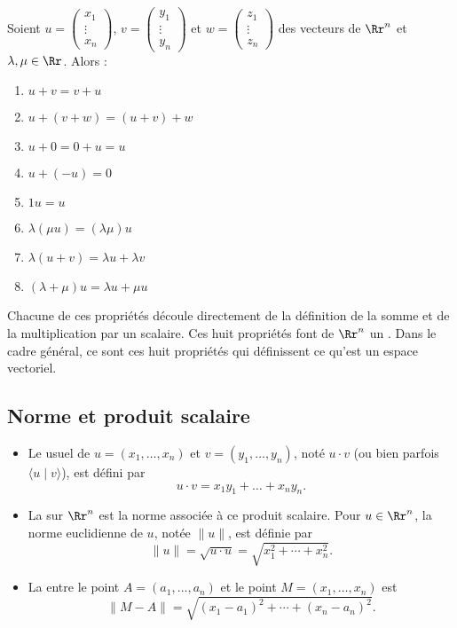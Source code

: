 \documentclass[11pt,class=report,crop=false]{standalone}
\begin{document}
\begin{theoreme}
Soient $u = \left(\begin{smallmatrix} x_1\\ \vdots \\ x_n \end{smallmatrix}\right)$, $v = \left(\begin{smallmatrix} y_1\\ \vdots \\ y_n \end{smallmatrix}\right)$
et $w = \left(\begin{smallmatrix} z_1\\ \vdots \\ z_n \end{smallmatrix}\right)$ des vecteurs de $\Rr^n$
et $\lambda, \mu \in \Rr$. Alors :
\begin{enumerate}
\item $u + v = v + u$
\item $u + (v+w) = (u+v) +w$
\item $u + 0 = 0 + u = u$
\item $u + (-u) = 0$
\item $1 u = u$
\item $\lambda (\mu u) = (\lambda\mu )u$
\item $\lambda (u+v) = \lambda u + \lambda v$
\item $(\lambda + \mu ) u = \lambda u + \mu u$
\end{enumerate}
\end{theoreme}



Chacune de ces propriétés découle directement de la définition de la somme
et de la multiplication par un scalaire. Ces huit propriétés font de $\Rr^n$ un
. Dans le cadre général, ce sont ces huit propriétés qui définissent
ce qu'est un espace vectoriel.

\subsection{Norme et produit scalaire}

\begin{itemize}
    \item Le  usuel de $u=(x_1,\ldots ,x_n)$ et $v=(y_1,\ldots ,y_n)$, noté $u \cdot v$ (ou bien parfois $\langle u \mid v\rangle$), est défini par
  $$u \cdot v= x_1y_1+\dots +x_ny_n.$$
  
    \item La  sur $\Rr^n$ est la norme associée à ce produit scalaire. Pour $u\in \Rr^n$, la norme euclidienne de $u$, notée $\| u\|$, est définie par
  $$\| u \| = \sqrt{u \cdot u} = \sqrt{x_1^2+\cdots +x_n^2}.$$
  
    \item La  entre le point $A = (a_1,\ldots ,a_n)$ et le point $M=(x_1,\dots ,x_n)$ est 
    $$\|M-A\|=\sqrt{(x_1-a_1)^2+\cdots +(x_n-a_n)^2}.$$
\end{itemize}  
\end{document}
